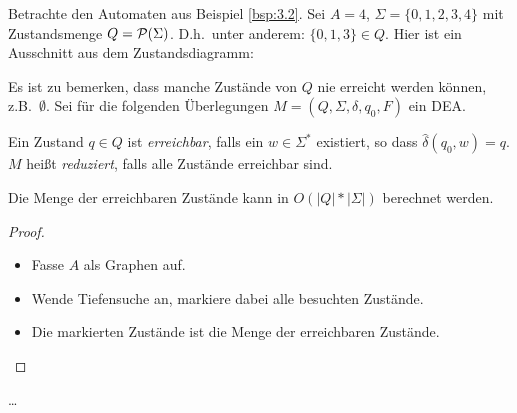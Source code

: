Betrachte den Automaten aus Beispiel \ref{bsp:3.2}.
Sei $A =4$, $\Sigma = \{0, 1, 2, 3, 4\}$ mit Zustandsmenge $Q = \mathcal{P}(\Sigma)$.
D.h.\ unter anderem: $\{0, 1, 3\} \in Q$.
Hier ist ein Ausschnitt aus dem Zustandsdiagramm:

\begin{center}
\end{center}
Es ist zu bemerken, dass manche Zustände von $Q$ nie erreicht werden können, z.B.\ $\emptyset$.
Sei für die folgenden Überlegungen $M = (Q, \Sigma, \delta, q_0, F)$ ein DEA.

\begin{Def}
  Ein Zustand $q \in Q$ ist \emph{erreichbar}, falls ein $w \in \Sigma^*$ existiert, so dass $\hat \delta(q_0, w) = q$.
  $M$ heißt \emph{reduziert}, falls alle Zustände erreichbar sind.
\end{Def}
\begin{Satz}
  Die Menge der erreichbaren Zustände kann in $O(|Q|*|\Sigma|)$ berechnet werden.
\end{Satz}
\begin{proof}~\\
  \vspace{-\baselineskip}
  \begin{itemize}
  \item Fasse $A$ als Graphen auf.
  \item Wende Tiefensuche an, markiere dabei alle besuchten Zustände.
  \item Die markierten Zustände ist die Menge der erreichbaren Zustände.
  \end{itemize}
\end{proof}

\ldots 




